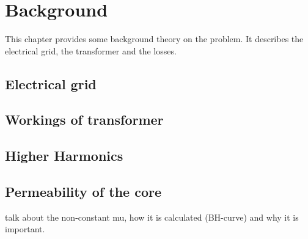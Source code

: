 \chapter{Background} \label{sec:background}

This chapter provides some background theory on the problem. It describes the electrical grid, the transformer and the losses.

\section{Electrical grid}

\section{Workings of transformer}

\section{Higher Harmonics}

\section{Permeability of the core}
talk about the non-constant mu, how it is calculated (BH-curve) and why it is important.